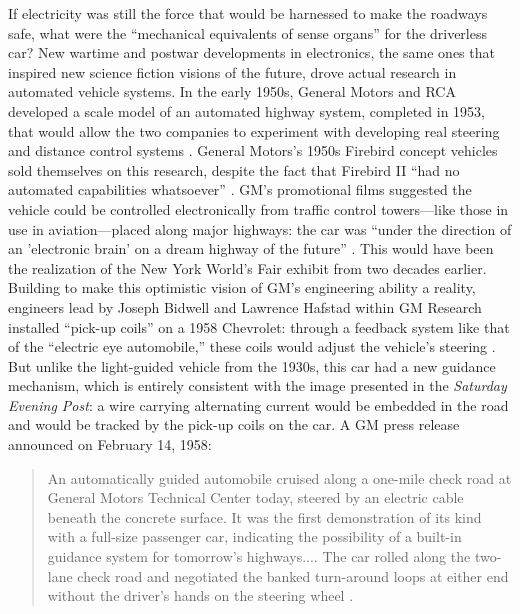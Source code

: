 If electricity was still the force that would be harnessed to make the
roadways safe, what were the ``mechanical equivalents of sense
organs'' \cite{wienerMachineThreat}for the driverless car? New
wartime and postwar developments in electronics, the same ones that
inspired new science fiction visions of the future, drove actual
research in automated vehicle systems. In the early 1950s, General
Motors and RCA developed a scale model of an automated highway system,
completed in 1953, that would allow the two companies to experiment
with developing real steering and distance control systems \cite[p. 6]{wetmore}.
General Motors's 1950s Firebird concept
vehicles sold themselves on this research, despite the fact that
Firebird II ``had no automated capabilities whatsoever'' \cite[p. 7]{wetmore}. GM's
promotional films suggested the vehicle could be controlled
electronically from traffic control towers---like those in use in
aviation---placed along major highways: the car was ``under the direction
of an 'electronic brain' on a dream highway of the future'' \cite[p.
  7]{wetmore}. This 
would have been the realization of the New York World's Fair exhibit
from two decades earlier. Building to make
this optimistic vision of GM's engineering ability a reality,
engineers lead by Joseph Bidwell and Lawrence Hafstad within GM
Research installed ``pick-up coils'' on a 1958 Chevrolet: through a
feedback system like that of the ``electric eye automobile,'' these
coils would adjust the vehicle's steering \cite[p. 7]{wetmore}. But unlike the
light-guided vehicle from the 1930s, this car had a new guidance
mechanism, which is entirely consistent with the image presented in
the \emph{Saturday Evening Post}: a wire carrying alternating current would
be embedded in the road and would be tracked by the pick-up coils on
the car. A GM press release announced on February 14, 1958:
\begin{quote}
An automatically guided automobile cruised along a one-mile check road
at General Motors Technical Center today, steered by an electric cable
beneath the concrete surface. It was the first demonstration of its
kind with a full-size passenger car, indicating the possibility of a
built-in guidance system for tomorrow's highways.... The car rolled
along the two-lane check road and negotiated the banked turn-around
loops at either end without the driver's hands on the steering wheel
\cite[p. 7]{wetmore}.
\end{quote}


